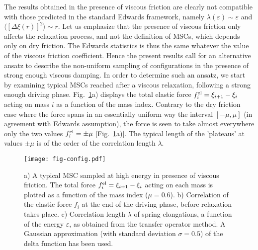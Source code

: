 \documentclass[prl,twocolumn,floats,floatfix,aps,superscriptaddress,showpacs]{revtex4-1}
\newcommand{\ve}{\varepsilon}
\begin{document}
The results obtained in the presence of viscous friction are clearly not compatible with those predicted in the standard Edwards framework, namely $\lambda(\ve) \sim \ve$ and $\langle[\Delta \xi(r)]^2\rangle \sim r$.
Let us emphasize that the presence of viscous friction only affects the relaxation process, and not the definition of MSCs, which depends only on dry friction.
The Edwards statistics is thus the same whatever the value of the viscous friction coefficient.
Hence the present results call for an alternative ansatz to describe the
non-uniform sampling of configurations in the presence of strong enough viscous damping. In order to determine such an ansatz, we start by
examining typical MSCs reached after a viscous relaxation, following a strong enough driving phase.
Fig.~\ref{fig-config}a) displays the total elastic force $f_i^{\rm el}=\xi_{i+1}-\xi_i$ acting on mass $i$ as a function of the mass index. Contrary to the dry friction case where the force spans in an essentially uniform way the interval $[-\mu,\mu]$ (in agreement with Edwards assumption), the force is seen to take almost everywhere only the two values $f_i^{\rm el}=\pm \mu$ [Fig.~\ref{fig-config}a)].
The typical length of the 'plateaus' at values $\pm \mu$ is of the order of the correlation length $\lambda$.

\begin{figure}[t!]
  \texttt{[image: fig-config.pdf]}
  \caption{a) A typical MSC sampled at high energy in presence of viscous friction. The total force $f_i^{\rm el}=\xi_{i+1}-\xi_i$ acting on each mass is plotted as a function of the mass index ($\mu=0.6$).
b) Correlation of the elastic force $f_i$ at the end of the driving phase, before relaxation takes place.
c) Correlation length $\lambda$ of spring elongations, a function of the energy $\ve$, as obtained from the transfer operator method.
A Gaussian approximation (with standard deviation $\sigma=0.5$) of the delta function has been used.}
  \label{fig-config}
\end{figure}
\end{document}
